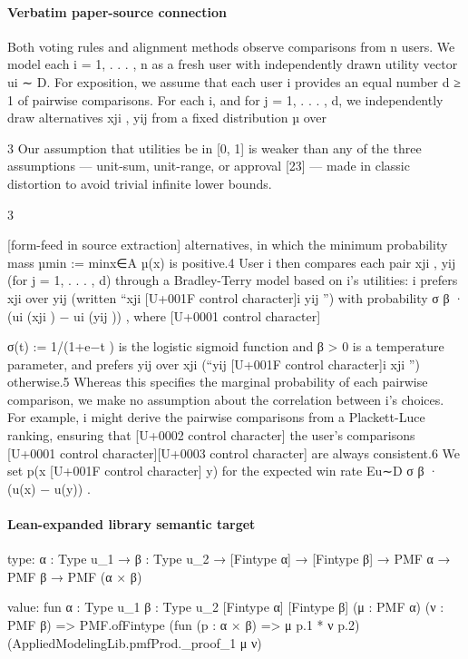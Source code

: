 \documentclass[10pt]{article}
\begin{document}
\paragraph{Verbatim paper-source connection}
\begin{ReviewVerbatim}
Both voting rules and alignment methods observe comparisons from n users. We model each
i = 1, . . . , n as a fresh user with independently drawn utility vector ui ∼ D. For exposition, we
assume that each user i provides an equal number d ≥ 1 of pairwise comparisons. For each i,
and for j = 1, . . . , d, we independently draw alternatives xji , yij from a fixed distribution µ over

    3
     Our assumption that utilities be in [0, 1] is weaker than any of the three assumptions — unit-sum, unit-range,
or approval [23] — made in classic distortion to avoid trivial infinite lower bounds.


                                                           3

[form-feed in source extraction]
alternatives, in which the minimum probability mass µmin := minx∈A µ(x) is positive.4 User i
then compares each pair {xji , yij } (for j = 1, . . . , d) through a Bradley-Terry model based on i’s
utilities: i prefers xji over yij (written “xji [U+001F control character]i yij ”) with probability σ β · (ui (xji ) − ui (yij )) , where
                                                                                                        [U+0001 control character]

σ(t) := 1/(1+e−t ) is the logistic sigmoid function and β > 0 is a temperature parameter, and prefers
yij over xji (“yij [U+001F control character]i xji ”) otherwise.5 Whereas this specifies the marginal probability of each pairwise
comparison, we make no assumption about the correlation between i’s choices. For example, i might
derive the pairwise comparisons from a Plackett-Luce ranking, ensuring that      [U+0002 control character] the user’s comparisons  [U+0001 control character][U+0003 control character]
are always consistent.6 We set p(x [U+001F control character] y) for the expected win rate Eu∼D σ β · (u(x) − u(y)) .
\end{ReviewVerbatim}



\paragraph{Lean-expanded library semantic target}
\begin{ReviewVerbatim}
type:
{α : Type u_1} → {β : Type u_2} → [Fintype α] → [Fintype β] → PMF α → PMF β → PMF (α × β)

value:
fun {α : Type u_1} {β : Type u_2} [Fintype α] [Fintype β] (μ : PMF α) (ν : PMF β) =>
  PMF.ofFintype (fun (p : α × β) => μ p.1 * ν p.2) (AppliedModelingLib.pmfProd._proof_1 μ ν)
\end{ReviewVerbatim}
\end{document}
